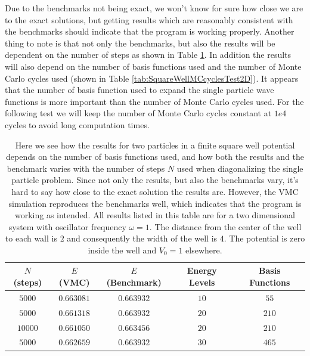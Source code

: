 \documentclass[../main.tex]{subfiles}
\begin{document}
Due to the benchmarks not being exact, we won't know for sure how close we are to the exact solutions, but getting results which are reasonably consistent with the benchmarks should indicate that the program is working properly. Another thing to note is that not only the benchmarks, but also the results will be dependent on the number of steps as shown in Table \ref{tab:SquareWellPreTest2D}. In addition the results will also depend on the number of basis functions used and the number of Monte Carlo cycles used (shown in Table \ref{tab:SquareWellMCcyclesTest2D}). It appears that the number of basis function used to expand the single particle wave functions is more important than the number of Monte Carlo cycles used. For the following test we will keep the number of Monte Carlo cycles constant at $1e4$ cycles to avoid long computation times.

\begin{table}[!ht]
  \centering
  \begin{tabular}{ | c | c | c | c | c | }
    \hline
    $N$ (steps) & $E$ (VMC) & $E$ (Benchmark) &  Energy Levels & Basis Functions\\*
    \hline
    $5000$ & $0.663081$ & $0.663932$ & $10$ & $55$ \\*
    \hline
    $5000$ & $0.661318$ & $0.663932$ & $20$ & $210$ \\*
    \hline
    $10000$ & $0.661050$ & $0.663456$ & $20$ & $210$ \\*
    \hline
    $5000$ & $0.662659$ & $0.663932$ & $30$ & $465$ \\*
    \hline
  \end{tabular}
  \caption{Here we see how the results for two particles in a finite square well potential depends on the number of basis functions used, and how both the results and the benchmark varies with the number of steps $N$ used when diagonalizing the single particle problem. Since not only the results, but also the benchmarks vary, it's hard to say how close to the exact solution the results are. However, the VMC simulation reproduces the benchmarks well, which indicates that the program is working as intended. All results listed in this table are for a two dimensional system with oscillator frequency $\omega = 1$. The distance from the center of the well to each wall is $2$ and consequently the width of the well is $4$. The potential is zero inside the well and $V_0 = 1$ elsewhere.}
  \label{tab:SquareWellPreTest2D}
\end{table}
\end{document}
